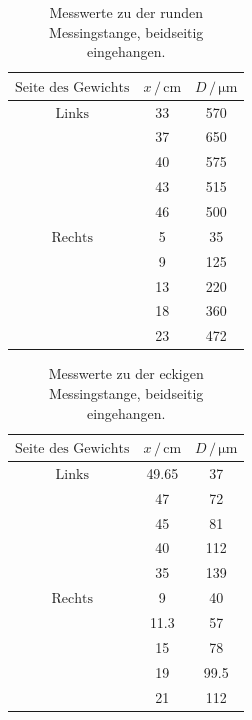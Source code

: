 \begin{table}
	\centering
	\caption{Messwerte zu der runden Messingstange, beidseitig eingehangen.} 
	\label{tab:vana} 
	\begin{tabular}{c c c}
	\toprule
	$\text{Seite des Gewichts} $&$x \, / \, \si{\centi\meter}$ & $D \, / \, \si{\micro\meter}$\\
	\midrule
    $\text{Links}$ & 33     &     570\\
    & 37     &     650\\
    & 40     &     575\\
    & 43     &     515\\
    & 46     &     500\\
    $\text{Rechts}$ & 5      &      35\\
    & 9      &     125\\
    & 13     &     220\\
    & 18     &     360\\
    & 23     &     472\\
\bottomrule
	\end{tabular}
\end{table}

\begin{table}
	\centering
	\caption{Messwerte zu der eckigen Messingstange, beidseitig eingehangen.} 
	\label{tab:vana} 
	\begin{tabular}{c c c}
	\toprule
	$\text{Seite des Gewichts} $&$x \, / \, \si{\centi\meter}$ & $D \, / \, \si{\micro\meter}$\\
	\midrule
    $\text{Links}$ & 49.65   &     37\\
    &47     &      72\\
    &45     &      81\\
    &40     &     112\\
    &35     &     139\\
    $\text{Rechts}$ & 9       &     40\\
    &11.3  &       57\\
    &15    &       78\\
    &19    &     99.5\\
    &21    &      112\\
\bottomrule
	\end{tabular}
\end{table}


